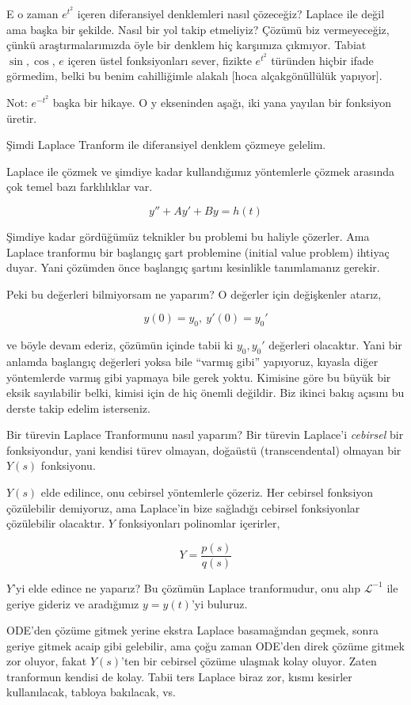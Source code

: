 \documentclass[12pt,fleqn]{article}\usepackage{../../common}
\begin{document}
E o zaman $e^{t^2}$ içeren diferansiyel denklemleri nasıl çözeceğiz?
Laplace ile değil ama başka bir şekilde. Nasıl bir yol takip etmeliyiz?
Çözümü biz vermeyeceğiz, çünkü araştırmalarımızda öyle bir denklem hiç
karşımıza çıkmıyor. Tabiat $\sin, \cos$, $e$ içeren üstel fonksiyonları
sever, fizikte $e^{t^2}$ türünden hiçbir ifade görmedim, belki bu benim
cahilliğimle alakalı [hoca alçakgönüllülük yapıyor]. 

Not: $e^{-t^2}$ başka bir hikaye. O y ekseninden aşağı, iki yana yayılan bir
fonksiyon üretir. 

Şimdi Laplace Tranform ile diferansiyel denklem çözmeye gelelim. 

Laplace ile çözmek ve şimdiye kadar kullandığımız yöntemlerle çözmek
arasında çok temel bazı farklılıklar var. 

$$ y'' + Ay' + By = h(t) $$

Şimdiye kadar gördüğümüz teknikler bu problemi bu haliyle çözerler. Ama
Laplace tranformu bir başlangıç şart problemine (initial value problem)
ihtiyaç duyar. Yani çözümden önce başlangıç şartını kesinlikle tanımlamanız
gerekir. 

Peki bu değerleri bilmiyorsam ne yaparım? O değerler için değişkenler
atarız, 

$$ y(0) = y_0, \ y'(0) = y_0' $$

ve böyle devam ederiz, çözümün içinde tabii ki $y_0,y_0'$ değerleri
olacaktır. Yani bir anlamda başlangıç değerleri yoksa bile ``varmış gibi''
yapıyoruz, kıyasla diğer yöntemlerde varmış gibi yapmaya bile gerek
yoktu. Kimisine göre bu büyük bir eksik sayılabilir belki, kimisi için de
hiç önemli değildir. Biz ikinci bakış açısını bu derste takip edelim
isterseniz.

Bir türevin Laplace Tranformunu nasıl yaparım? Bir türevin Laplace'i
{\em cebirsel} bir fonksiyondur, yani kendisi türev olmayan, doğaüstü
(transcendental) olmayan bir $Y(s)$ fonksiyonu. 

$Y(s)$ elde edilince, onu cebirsel yöntemlerle çözeriz. Her cebirsel
fonksiyon çözülebilir demiyoruz, ama Laplace'in bize sağladığı cebirsel
fonksiyonlar çözülebilir olacaktır. $Y$ fonksiyonları polinomlar içerirler, 

$$ Y = \frac{p(s)}{q(s)} $$

$Y$'yi elde edince ne yaparız? Bu çözümün Laplace tranformudur, onu alıp
$\mathcal{L}^{-1}$ ile geriye gideriz ve aradığımız $y = y(t)$'yi buluruz. 

ODE'den çözüme gitmek yerine ekstra Laplace basamağından geçmek, sonra
geriye gitmek acaip gibi gelebilir, ama çoğu zaman ODE'den direk çözüme
gitmek zor oluyor, fakat $Y(s)$'ten bir cebirsel çözüme ulaşmak kolay
oluyor. Zaten tranformun kendisi de kolay. Tabii ters Laplace biraz zor,
kısmı kesirler kullanılacak, tabloya bakılacak, vs. 
\end{document}
